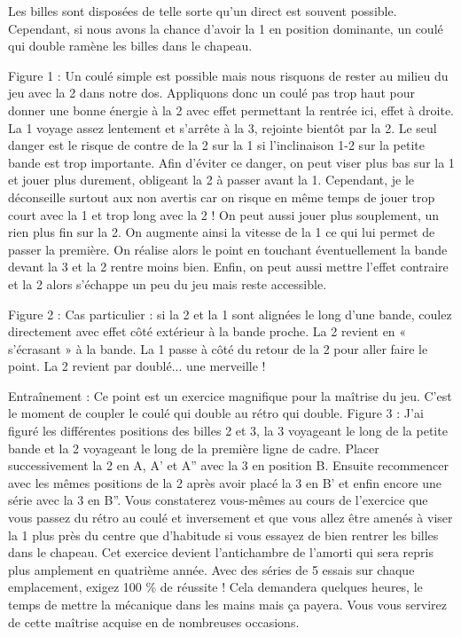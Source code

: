 Les billes sont disposées de telle sorte qu'un direct est souvent
possible. Cependant, si nous avons la chance d'avoir la 1 en position
dominante, un coulé qui double ramène les billes dans le chapeau.

Figure 1 : Un coulé simple est possible mais nous risquons de rester au
milieu du jeu avec la 2 dans notre dos. Appliquons donc un coulé pas
trop haut pour donner une bonne énergie à la 2 avec effet permettant la
rentrée ici, effet à droite. La 1 voyage assez lentement et s'arrête à
la 3, rejointe bientôt par la 2. Le seul danger est le risque de contre
de la 2 sur la 1 si l'inclinaison 1-2 sur la petite bande est trop
importante. Afin d'éviter ce danger, on peut viser plus bas sur la 1 et
jouer plus durement, obligeant la 2 à passer avant la 1. Cependant, je
le déconseille surtout aux non avertis car on risque en même temps de
jouer trop court avec la 1 et trop long avec la 2 ! On peut aussi jouer
plus souplement, un rien plus fin sur la 2. On augmente ainsi la vitesse
de la 1 ce qui lui permet de passer la première. On réalise alors le
point en touchant éventuellement la bande devant la 3 et la 2 rentre
moins bien. Enfin, on peut aussi mettre l'effet contraire et la 2 alors
s'échappe un peu du jeu mais reste accessible.

Figure 2 : Cas particulier : si la 2 et la 1 sont alignées le long d'une
bande, coulez directement avec effet côté extérieur à la bande proche.
La 2 revient en « s'écrasant » à la bande. La 1 passe à côté du retour
de la 2 pour aller faire le point. La 2 revient par doublé... une
merveille !

Entraînement : Ce point est un exercice magnifique pour la maîtrise du
jeu. C'est le moment de coupler le coulé qui double au rétro qui double.
Figure 3 : J'ai figuré les différentes positions des billes 2 et 3, la 3
voyageant le long de la petite bande et la 2 voyageant le long de la
première ligne de cadre. Placer successivement la 2 en A, A' et A'' avec
la 3 en position B. Ensuite recommencer avec les mêmes positions de la 2
après avoir placé la 3 en B' et enfin encore une série avec la 3 en B''.
Vous constaterez vous-mêmes au cours de l'exercice que vous passez du
rétro au coulé et inversement et que vous allez être amenés à viser la 1
plus près du centre que d'habitude si vous essayez de bien rentrer les
billes dans le chapeau. Cet exercice devient l'antichambre de l'amorti
qui sera repris plus amplement en quatrième année. Avec des séries de 5
essais sur chaque emplacement, exigez 100 \% de réussite ! Cela
demandera quelques heures, le temps de mettre la mécanique dans les
mains mais ça payera. Vous vous servirez de cette maîtrise acquise en de
nombreuses occasions.

